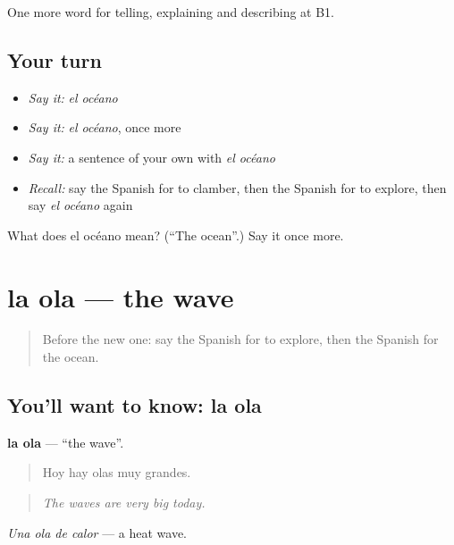\begin{grammarlens}[title={What you've built}]
One more word for telling, explaining and describing at B1.
\end{grammarlens}

\subsection*{Your turn}
\begin{itemize}
\raggedright
  \item \emph{Say it:} \emph{el océano}
  \item \emph{Say it:} \emph{el océano}, once more
  \item \emph{Say it:} a sentence of your own with \emph{el océano}
  \item \emph{Recall:} say the Spanish for to clamber, then the Spanish for to explore, then say \emph{el océano} again
\end{itemize}

\begin{tcolorbox}[breakable,colback=teal!4,colframe=teal!35!black,title={Before you move on}]
What does el océano mean? (\textquotedblleft{}The ocean\textquotedblright{}.) Say it once more.
\end{tcolorbox}
\section[la ola]{la ola — the wave}

\label{lesson:ES-C688-ola}



\begin{quote}
Before the new one: say the Spanish for to explore, then the Spanish for the ocean.
\end{quote}

\subsection*{You'll want to know: la ola}
\textbf{la ola} — \textquotedblleft{}the wave\textquotedblright{}.

\begin{quote}
Hoy hay olas muy grandes.
\end{quote}

\begin{quote}
\emph{The waves are very big today.}
\end{quote}

\emph{Una ola de calor} — a heat wave.

